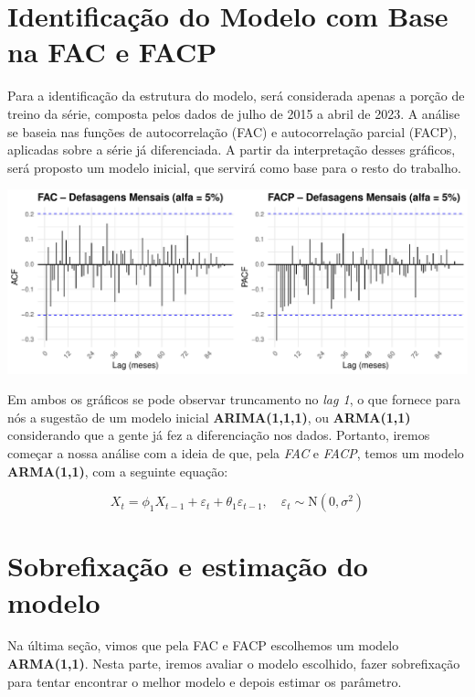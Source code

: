 \documentclass[
]{article}
\begin{document}
\newpage

\section{\texorpdfstring{\textbf{Identificação do Modelo com Base na FAC
e
FACP}}{Identificação do Modelo com Base na FAC e FACP}}\label{identificauxe7uxe3o-do-modelo-com-base-na-fac-e-facp}

Para a identificação da estrutura do modelo, será considerada apenas a
porção de treino da série, composta pelos dados de julho de 2015 a abril
de 2023. A análise se baseia nas funções de autocorrelação (FAC) e
autocorrelação parcial (FACP), aplicadas sobre a série já diferenciada.
A partir da interpretação desses gráficos, será proposto um modelo
inicial, que servirá como base para o resto do trabalho.

\includegraphics{analise-series-temporais-flamengo_files/figure-latex/acf-pacf-1.pdf}

Em ambos os gráficos se pode observar truncamento no \emph{lag 1}, o que
fornece para nós a sugestão de um modelo inicial \textbf{ARIMA(1,1,1)},
ou \textbf{ARMA(1,1)} considerando que a gente já fez a diferenciação
nos dados. Portanto, iremos começar a nossa análise com a ideia de que,
pela \emph{FAC} e \emph{FACP}, temos um modelo \textbf{ARMA(1,1)}, com a
seguinte equação:

\begin{equation}
X_t = \phi_1 X_{t-1} + \varepsilon_t + \theta_1 \varepsilon_{t-1}, \quad \varepsilon_t \sim \text{N}(0, \sigma^2)
\end{equation}

\section{\texorpdfstring{\textbf{Sobrefixação e estimação do
modelo}}{Sobrefixação e estimação do modelo}}\label{sobrefixauxe7uxe3o-e-estimauxe7uxe3o-do-modelo}

Na última seção, vimos que pela FAC e FACP escolhemos um modelo
\textbf{ARMA(1,1)}. Nesta parte, iremos avaliar o modelo escolhido,
fazer sobrefixação para tentar encontrar o melhor modelo e depois
estimar os parâmetro.
\end{document}

